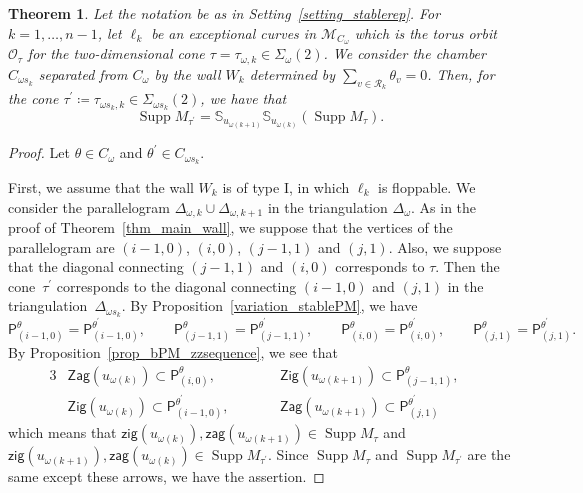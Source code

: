 \documentclass[pdftex]{sigma}
\numberwithin{equation}{section}
\newtheorem{Theorem}{Theorem}[section]
\theoremstyle{definition}
\newcommand{\BS}{\mathbb{S}}
\newcommand{\calM}{\mathcal{M}}
\newcommand{\calO}{\mathcal{O}}
\newcommand{\calR}{\mathcal{R}}
\newcommand{\sfP}{\mathsf{P}}
\newcommand{\Supp}{\operatorname{Supp}}
\newcommand{\Zig}{\mathsf{Zig}}
\newcommand{\Zag}{\mathsf{Zag}}
\newcommand{\aZig}{\mathsf{zig}}
\newcommand{\aZag}{\mathsf{zag}}
\newcommand{\permII}{\omega}
\begin{document}
\begin{Theorem}\label{thm_variation_support}
Let the notation be as in Setting~{\rm \ref{setting_stablerep}}.
For $k=1, \dots, n-1$, let $\ell_k$ be an exceptional curves in $\calM_{C_\permII}$ which is the torus orbit $\calO_{\tau}$
for the two-dimensional cone $\tau=\tau_{\permII, k}\in\Sigma_\permII(2)$.
We consider the chamber $C_{\permII s_k}$ separated from $C_\permII$ by the wall $W_k$ determined by $\sum_{v\in\calR_k}\theta_v=0$.
Then, for the cone $\tau^\prime\coloneqq\tau_{\permII s_k, k}\in\Sigma_{\permII s_k}(2)$, we have that
\[
\Supp M_{\tau^\prime}=\BS_{u_{\permII(k+1)}}\BS_{u_{\permII(k)}}(\Supp M_\tau).
\]
\end{Theorem}

\begin{proof}
Let $\theta\in C_\permII$ and $\theta^\prime\in C_{\permII s_k}$.

First, we assume that the wall $W_k$ is of type I, in which $\ell_k$ is floppable.
We consider the parallelogram $\Delta_{\permII,k}\cup\Delta_{\permII,k+1}$ in the triangulation $\Delta_{\permII}$.
As in the proof of Theorem~\ref{thm_main_wall}, we suppose that the vertices of the parallelogram are $(i-1, 0)$, $(i,0)$, $(j-1,1)$ and $(j,1)$.
Also, we suppose that the diagonal connecting $(j-1, 1)$ and $(i,0)$ corresponds to $\tau$.
Then the cone~$\tau^\prime$ corresponds to the diagonal connecting $(i-1, 0)$ and $(j,1)$ in the triangulation~$\Delta_{\permII s_k}$.
By Proposition~\ref{variation_stablePM}, we have
\[
\sfP^\theta_{(i-1,0)}=\sfP^{\theta^\prime}_{(i-1,0)}, \qquad \sfP^\theta_{(j-1,1)}=\sfP^{\theta^\prime}_{(j-1,1)}, \qquad
\sfP^\theta_{(i,0)}=\sfP^{\theta^\prime}_{(i,0)}, \qquad \sfP^\theta_{(j,1)}=\sfP^{\theta^\prime}_{(j,1)}.
\]
By Proposition~\ref{prop_bPM_zzsequence}, we see that
\begin{alignat*}{3}
& \Zag(u_{\permII(k)})\subset \sfP^\theta_{(i,0)}, \qquad&& \Zig(u_{\permII(k+1)})\subset \sfP^\theta_{(j-1,1)}, &\\
& \Zig(u_{\permII(k)})\subset \sfP^{\theta^\prime}_{(i-1,0)}, \qquad&& \Zag(u_{\permII(k+1)})\subset \sfP^{\theta^\prime}_{(j,1)}&
\end{alignat*}
which means that $\aZig(u_{\permII(k)}), \aZag(u_{\permII(k+1)})\in \Supp M_\tau$ and
$\aZig(u_{\permII(k+1)}), \aZag(u_{\permII(k)})\in \Supp M_{\tau^\prime}$.
Since $\Supp M_\tau$ and $\Supp M_{\tau^\prime}$ are the same except these arrows, we have the assertion.


\end{proof}
\end{document}
